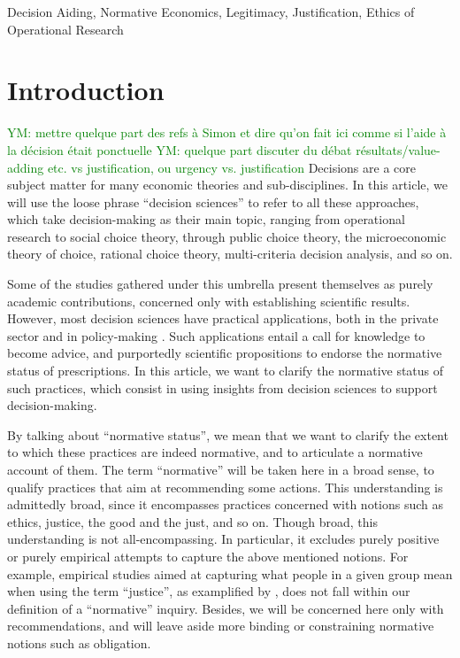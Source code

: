 \documentclass[preprint, french, english, 11pt, authoryear]{elsarticle}%
\newcommand{\commentYM}[1]{\textcolor{green}{YM: #1}}
\begin{document}
\begin{keyword}
Decision Aiding, Normative Economics, Legitimacy, Justification, Ethics of Operational Research
\end{keyword}

\maketitle

\section{Introduction}
\commentYM{mettre quelque part des refs à Simon et dire qu'on fait ici comme si l'aide à la décision était ponctuelle}
\commentYM{quelque part discuter du débat résultats/value-adding etc. vs justification, ou urgency vs. justification}
Decisions are a core subject matter for many economic theories and sub-disciplines. In this article, we will use the loose phrase “decision sciences” to refer to all these approaches, which take decision-making as their main topic, ranging from operational research to social choice theory, through public choice theory, the microeconomic theory of choice, rational choice theory, multi-criteria decision analysis, and so on.

Some of the studies gathered under this umbrella present themselves as purely academic contributions, concerned only with establishing scientific results. However, most decision sciences have practical applications, both in the private sector and in policy-making \citep{tsoukias_policy_2013,marchi_evidence-based_2016}. Such applications entail a call for knowledge to become advice, and purportedly scientific propositions to endorse the normative status of prescriptions. 
In this article, we want to clarify the normative status of such practices, which consist in using insights from decision sciences to support decision-making.

By talking about “normative status”, we mean that we want to clarify the extent to which these practices are indeed normative, and to articulate a normative account of them. 
The term “normative” will be taken here in a broad sense, to qualify practices that aim at recommending some actions. This understanding is admittedly broad, since it encompasses practices concerned with notions such as ethics, justice, the good and the just, and so on. 
Though broad, this understanding is not all-encompassing. In particular, it excludes purely positive or purely empirical attempts to capture the above mentioned notions. For example, empirical studies aimed at capturing what people in a given group mean when using the term “justice”, as examplified by \citet{gaertner_empirical_2012}, does not fall within our definition of a “normative” inquiry. Besides, we will be concerned here only with recommendations, and will leave aside more binding or constraining normative notions such as obligation.
\end{document}
